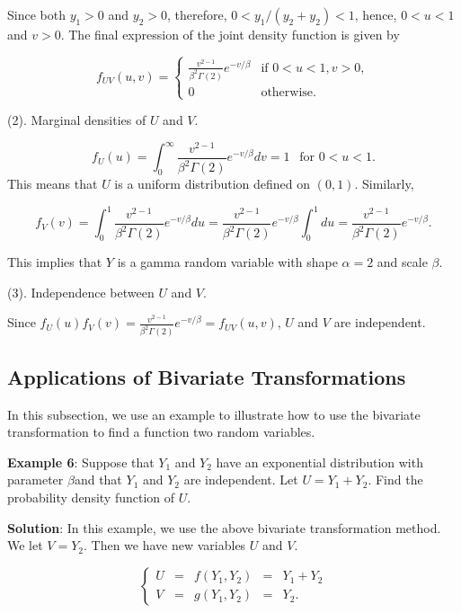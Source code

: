 \documentclass[
]{book}
\begin{document}
Since both \(y_1 > 0\) and \(y_2 > 0\), therefore, \(0 < y_1/(y_2 + y_2) < 1\), hence, \(0 < u < 1\) and \(v > 0\). The final expression of the joint density function is given by

\[
\displaystyle f_{UV}(u,v) = \begin{cases} 
 \frac{v^{2-1}}{\beta^2\Gamma(2)}e^{-v/\beta} & \text{if $0 < u < 1, v > 0$}, \\  
 0 & \text{otherwise}.
 \end{cases}
\]

(2). Marginal densities of \(U\) and \(V\).

\[
f_U(u) = \int_0^\infty \frac{v^{2-1}}{\beta^2\Gamma(2)}e^{-v/\beta} dv = 1 \ \ \text{ for } 0 < u < 1.
\] This means that \(U\) is a uniform distribution defined on \((0, 1)\). Similarly,

\[
f_V(v) = \int_0^1 \frac{v^{2-1}}{\beta^2\Gamma(2)}e^{-v/\beta} du = \frac{v^{2-1}}{\beta^2\Gamma(2)}e^{-v/\beta} \int_0^1 du = \frac{v^{2-1}}{\beta^2\Gamma(2)}e^{-v/\beta}.
\]

This implies that \(Y\) is a gamma random variable with shape \(\alpha = 2\) and scale \(\beta\).

(3). Independence between \(U\) and \(V\).

Since \(f_U(u) f_V(v) = \frac{v^{2-1}}{\beta^2\Gamma(2)}e^{-v/\beta} = f_{UV}(u,v)\), \(U\) and \(V\) are independent.

\hypertarget{applications-of-bivariate-transformations}{%
\subsection{Applications of Bivariate Transformations}\label{applications-of-bivariate-transformations}}

In this subsection, we use an example to illustrate how to use the bivariate transformation to find a function two random variables.

\textbf{\color{red} Example 6}: Suppose that \(Y_1\) and \(Y_2\) have an exponential distribution with parameter \(\beta\)and that \(Y_1\) and \(Y_2\) are independent. Let \(U = Y_1 + Y_2\). Find the probability density function of \(U\).

\textbf{Solution}: In this example, we use the above bivariate transformation method. We let \(V = Y_2\). Then we have new variables \(U\) and \(V\).

\[
\left\{
\begin{array}{rrrrr}
   U & = & f(Y_1, Y_2) & = & Y_1 + Y_2 \\
   V & = & g(Y_1, Y_2) & = & Y_2.
\end{array}\right.
\]
\end{document}
